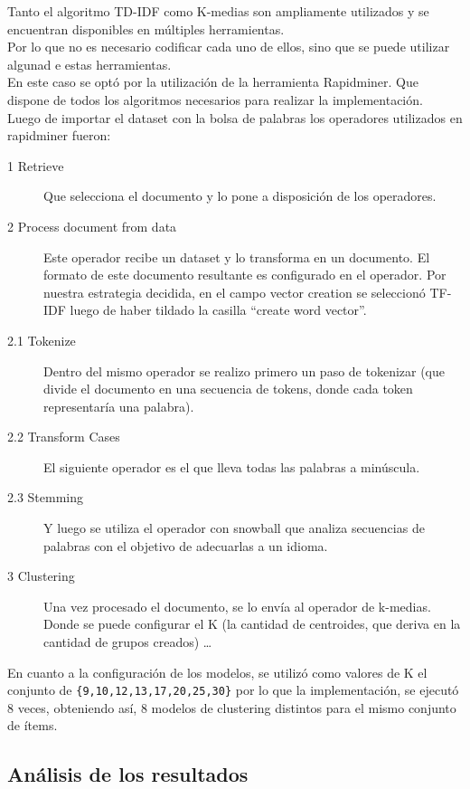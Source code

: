 Tanto el algoritmo TD-IDF como K-medias son ampliamente utilizados y se encuentran disponibles en múltiples herramientas.\\
Por lo que no es necesario codificar cada uno de ellos, sino que se puede utilizar algunad e estas herramientas.\\
En este caso se optó por la utilización de la herramienta Rapidminer. Que dispone de todos los algoritmos necesarios para realizar 
la implementación.\\
Luego de importar el dataset con la bolsa de palabras los operadores utilizados en rapidminer fueron:\\
\begin{description}
  \item[1 Retrieve] Que selecciona el documento y lo pone a disposición de los operadores. 
  \item[2 Process document from data] Este operador recibe un dataset y lo transforma en un documento. El formato de este documento resultante 
  es configurado en el operador. Por nuestra estrategia decidida, en el campo vector creation se seleccionó TF-IDF luego de haber tildado la casilla ``create word vector''.
  \item[2.1 Tokenize] Dentro del mismo operador se realizo primero un paso de tokenizar (que divide el documento en una secuencia de tokens, donde cada token representaría una palabra).
  \item[2.2 Transform Cases] El siguiente operador es el que lleva todas las palabras a minúscula.
  \item[2.3 Stemming] Y luego se utiliza el operador con snowball que analiza secuencias de palabras con el objetivo de adecuarlas a un idioma. 
  \item[3 Clustering] Una vez procesado el documento, se lo envía al operador de k-medias. Donde se puede configurar el K (la cantidad de centroides, que deriva en la cantidad de grupos creados) \ldots
\end{description}

En cuanto a la configuración de los modelos, se utilizó como valores de K el conjunto de \verb|{9,10,12,13,17,20,25,30}| por lo que la implementación, 
se ejecutó 8 veces, obteniendo así, 8 modelos de clustering distintos para el mismo conjunto de ítems.

\subsection{Análisis de los resultados}

